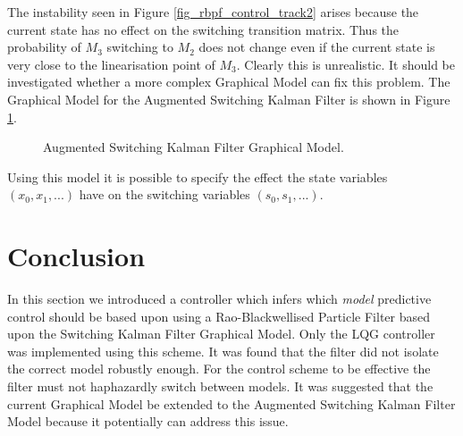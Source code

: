 The instability seen in Figure \ref{fig_rbpf_control_track2} arises because the current state has no effect on the switching transition matrix. Thus the probability of $M_3$ switching to $M_2$ does not change even if the current state is very close to the linearisation point of $M_3$. Clearly this is unrealistic. It should be investigated whether a more complex Graphical Model can fix this problem. The Graphical Model for the Augmented Switching Kalman Filter \cite{barber} is shown in Figure \ref{fig_gm_augmented}. 
\begin{figure}[H] 
\centering
{}
\caption{Augmented Switching Kalman Filter Graphical Model.}
\label{fig_gm_augmented}
\end{figure}
Using this model it is possible to specify the effect the state variables $(x_0,x_1,...)$ have on the switching variables $(s_0, s_1,...)$.  

\section{Conclusion}
In this section we introduced a controller which infers which \textit{model} predictive control should be based upon using a Rao-Blackwellised Particle Filter based upon the Switching Kalman Filter Graphical Model. Only the LQG controller was implemented using this scheme. It was found that the filter did not isolate the correct model robustly enough. For the control scheme to be effective the filter must not haphazardly switch between models. It was suggested that the current Graphical Model be extended to the Augmented Switching Kalman Filter Model because it potentially can address this issue.
